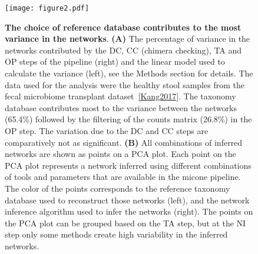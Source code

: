   \begin{figure}[H]
    \centering
    \texttt{[image: figure2.pdf]}
  \end{figure}
  \begin{figure}[H]
    \centering
      \caption{
      \textbf{The choice of reference database contributes to the most variance in the networks}.
      \textbf{(A)} The percentage of variance in the networks contributed by the DC, CC (chimera checking), TA and OP steps of the pipeline (right) and the linear model used to calculate the variance (left), see the Methods section for details.
      The data used for the analysis were the healthy stool samples from the fecal microbiome transplant dataset~\ref{Kang2017}.
      The taxonomy database contributes most to the variance between the networks (65.4\%) followed by the filtering of the counts matrix (26.8\%) in the OP step.
      The variation due to the DC and CC steps are comparatively not as significant.
      \textbf{(B)} All combinations of inferred networks are shown as points on a PCA plot.
      Each point on the PCA plot represents a network inferred using different combinations of tools and parameters that are available in the \ac{micone} pipeline.
      The color of the points corresponds to the reference taxonomy database used to reconstruct those networks (left), and the network inference algorithm used to infer the networks (right).
      The points on the PCA plot can be grouped based on the TA step, but at the NI step only some methods create high variability in the inferred networks.
    }
    \label{fig:figure2}
  \end{figure}
  \FloatBarrier
  \newpage

